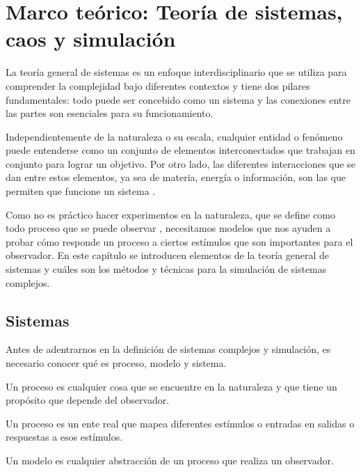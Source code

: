 \chapter{Marco teórico: Teoría de sistemas, caos y simulación}

La teoría general de sistemas es un enfoque interdisciplinario que se utiliza para comprender la complejidad bajo diferentes contextos y tiene dos pilares fundamentales: todo puede ser concebido como un sistema y las conexiones entre las partes son esenciales para su funcionamiento.

Independientemente de la naturaleza o su escala, cualquier entidad o fenómeno puede entenderse como un conjunto de elementos interconectados que trabajan en conjunto para lograr un objetivo. Por otro lado, las diferentes interacciones que se dan entre estos elementos, ya sea de materia, energía o información, son las que permiten que funcione un sistema \cite{dinamicos}.

Como no es práctico hacer experimentos en la naturaleza, que se define como todo proceso que se puede observar \cite{naturaleza}, necesitamos modelos que nos ayuden a probar cómo responde un proceso a ciertos estímulos que son importantes para el observador. En este capítulo se introducen elementos de la teoría general de sistemas y cuáles son los métodos y técnicas para la simulación de sistemas complejos.

\section{Sistemas}

Antes de adentrarnos en la definición de sistemas complejos y simulación, es necesario conocer qué es proceso, modelo y sistema.

\begin{definition}
	
	Un proceso es cualquier cosa que se encuentre en la naturaleza y que tiene un propósito que depende del observador.
	
\end{definition}

Un proceso es un ente real que mapea diferentes estímulos o entradas en salidas o respuestas a esos estímulos.

\begin{definition}
	
	Un modelo es cualquier abstracción de un proceso que realiza un observador.
	
\end{definition}


